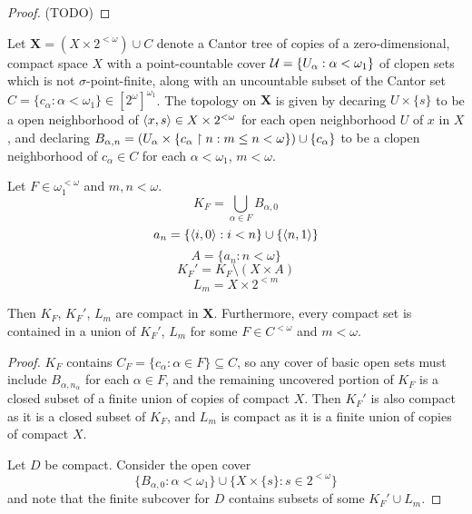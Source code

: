 \begin{proof}
  (TODO)
\end{proof}

\begin{defn}
  Let $\pmb X=(X\times 2^{<\omega})\cup C$ denote a Cantor tree
  of copies of a zero-dimensional, compact space $X$ with a point-countable
  cover $\mathcal{U} = \{U_\alpha : \alpha<\omega_1\}$ of
  clopen sets which is not $\sigma$-point-finite, along with an uncountable
  subset of the Cantor set
  $C=\{c_\alpha:\alpha<\omega_1\}\in [2^\omega]^{\omega_1}$.
  The topology on $\pmb X$ is
  given by decaring $U\times\{s\}$ to be a open
  neighborhood of $\langle x,s\rangle\in X\times 2^{<\omega}$ for each
  open neighborhood $U$ of $x$ in $X$, and declaring
  $B_{\alpha,n}=(U_\alpha\times\{c_\alpha\restriction n: m\leq n<\omega\})\cup\{c_\alpha\}$
  to be a clopen neighborhood of $c_\alpha\in C$ for each $\alpha<\omega_1$,
  $m<\omega$.
\end{defn}

\begin{defn}
  Let $F\in \omega_1^{<\omega}$ and $m,n<\omega$.
  \[
    K_F = \bigcup_{\alpha \in F} B_{\alpha,0}
  \]
  \[
    a_n = \{\langle i,0\rangle:i<n\}\cup\{\langle n,1\rangle\}
  \]
  \[
    A = \{a_n : n<\omega\}
  \]
  \[
    K_F' = K_F \setminus (X \times A)
  \]
  \[
    L_m = X \times 2^{<m}
  \]
\end{defn}

\begin{lem}
  Then $K_F$, $K_F'$, $L_m$ are compact in $\pmb X$.
  Furthermore, every compact set is contained in a union of $K_F'$, $L_m$
  for some $F\in C^{<\omega}$ and $m<\omega$.
\end{lem}

\begin{proof}
  $K_F$ contains $C_F=\{c_\alpha: \alpha\in F\}\subseteq C$, so any
  cover of basic open sets must include $B_{\alpha,n_\alpha}$ for each
  $\alpha\in F$, and the remaining uncovered portion of $K_F$ is a closed
  subset of a finite union of copies of compact $X$. Then $K_F'$ is also
  compact as it is a closed subset of $K_F$, and $L_m$ is compact as it
  is a finite union of copies of compact $X$.

  Let $D$ be compact. Consider the open cover
    \[
      \{
        B_{\alpha,0}
      :
        \alpha<\omega_1
      \}
      \cup
      \{
        X\times\{s\}
      :
        s\in 2^{<\omega}
      \}
    \]
  and note that the finite subcover for $D$ contains subsets of some
  $K_F' \cup L_m$.
\end{proof}

